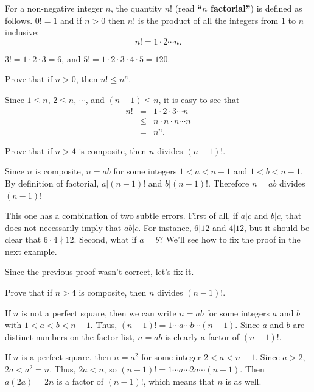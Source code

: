 \begin{df}
For a non-negative integer $n$, the quantity $n!$ (read {\bf ``$n$ factorial''}) is defined as follows.
$0! = 1$ and if $n>0$ then $n!$ is the product of all the integers from $1$ to $n$ inclusive: $$n! = 1\cdot 2 \cdots n.  $$
\end{df}

\begin{exa}
$3! = 1\cdot 2 \cdot 3 = 6$, and 
$5! = 1\cdot 2 \cdot 3 \cdot 4 \cdot 5 = 120$. 
\end{exa}

\begin{exa}
Prove that if $n>0$, then $n!\leq n^n$.
\begin{pf}
Since $1\leq n$, $2\leq n$, $\cdots$, and $(n-1)\leq n$, it is easy to see that
\begin{eqnarray*}
n!&=&1\cdot 2\cdot 3\cdots n\\
&\leq&n\cdot n\cdot n\cdots n\\
&=&n^n.
\end{eqnarray*}
\end{pf}
\end{exa}

\begin{eval}
Prove that if $n>4$ is composite, then $n$ divides $(n-1)!$.
\begin{spf}
Since $n$ is composite, $n=ab$ for some integers $1<a<n-1$ and $1<b<n-1$. 
By definition of factorial, $a | (n-1)!$ and $b |(n-1)!$.
Therefore $n=ab$ divides $(n-1)!$
\end{spf}
\evallinetwo
\begin{answer}
This one has a combination of two subtle errors.
First of all, if $a|c$ and $b|c$, that does not necessarily imply that $ab|c$.
For instance, $6|12$ and $4|12$, but it should be clear that $6\cdot 4\nmid 12$.
Second, what if $a=b$?
We'll see how to fix the proof in the next example.
\end{answer}
\end{eval}

Since the previous proof wasn't correct, let's fix it.

\begin{exa}\label{ndivfactExer}
Prove that if $n>4$ is composite, then $n$ divides $(n-1)!$.
\begin{pf} 
If $n$ is not a perfect square, then we can write $n=ab$ for some integers $a$ and $b$ with $1<a<b<n-1$.
Thus, $(n-1)! = 1\cdots a\cdots b\cdots (n-1)$.  Since $a$ and $b$ are distinct numbers on the factor list,
$n=ab$ is clearly a factor of $(n-1)!$.  

If $n$ is a perfect square, then $n=a^2$ for some integer $2<a<n-1$.
Since $a>2$, $2a<a^2=n$.  Thus, $2a<n$, so
$(n-1)! = 1\cdots a\cdots 2a\cdots (n-1)$.  Then $a(2a)=2n$ is a factor of $(n-1)!$, which means
that $n$ is as well.
\end{pf}

\end{exa}


